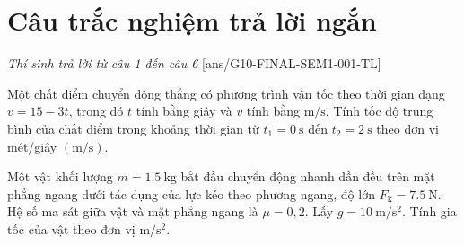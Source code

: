 \section{Câu trắc nghiệm trả lời ngắn} \textit{Thí sinh trả lời từ câu 1 đến câu 6}
\setcounter{ex}{0}
[ans/G10-FINAL-SEM1-001-TL]
\begin{ex}
	Một chất điểm chuyển động thẳng có phương trình vận tốc theo thời gian dạng $v=15-3t$, trong đó $t$ tính bằng giây và $v$ tính bằng $\si{\meter/\second}$. Tính tốc độ trung bình của chất điểm trong khoảng thời gian từ $t_1=\SI{0}{\second}$ đến $t_2=\SI{2}{\second}$ theo đơn vị mét/giây $\left(\si{\meter/\second}\right)$.
	\loigiai{
		
	}
\end{ex}
\begin{ex}
	Một vật khối lượng $m=\SI{1.5}{\kilogram}$ bắt đầu chuyển động nhanh dần đều trên mặt phẳng ngang dưới tác dụng của lực kéo theo phương ngang, độ lớn $F_{\mathrm{k}}=\SI{7.5}{\newton}$. Hệ số ma sát giữa vật và mặt phẳng ngang là $\mu=0,2$. Lấy $g=\SI{10}{\meter/\second^2}$. Tính gia tốc của vật theo đơn vị $\si{\meter/\second^2}$.
	\loigiai{
		
	}
\end{ex}
